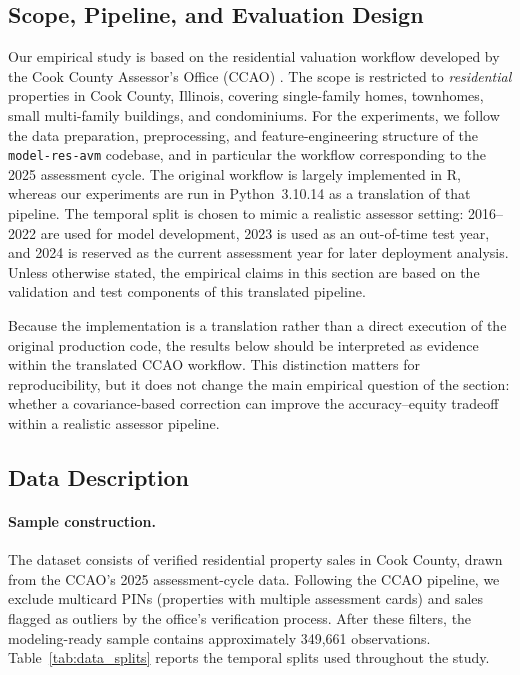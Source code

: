 \documentclass[12pt]{article}
\theoremstyle{plain}
\theoremstyle{definition}
\newcommand{\1}{\mathbf{1}}
\begin{document}
\subsection{Scope, Pipeline, and Evaluation Design}

Our empirical study is based on the residential valuation workflow developed by the Cook County Assessor's Office (CCAO) \cite{ccao_data_2026}. The scope is restricted to \emph{residential} properties in Cook County, Illinois, covering single-family homes, townhomes, small multi-family buildings, and condominiums. For the experiments, we follow the data preparation, preprocessing, and feature-engineering structure of the \texttt{model-res-avm} codebase, and in particular the workflow corresponding to the 2025 assessment cycle. The original workflow is largely implemented in R, whereas our experiments are run in Python~3.10.14 as a translation of that pipeline. The temporal split is chosen to mimic a realistic assessor setting: 2016--2022 are used for model development, 2023 is used as an out-of-time test year, and 2024 is reserved as the current assessment year for later deployment analysis. Unless otherwise stated, the empirical claims in this section are based on the validation and test components of this translated pipeline.

Because the implementation is a translation rather than a direct execution of the original production code, the results below should be interpreted as evidence within the translated CCAO workflow. This distinction matters for reproducibility, but it does not change the main empirical question of the section: whether a covariance-based correction can improve the accuracy--equity tradeoff within a realistic assessor pipeline.

\subsection{Data Description}
\label{subsec:data_description}

\paragraph{Sample construction.} The dataset consists of verified residential property sales in Cook County, drawn from the CCAO's 2025 assessment-cycle data. Following the CCAO pipeline, we exclude multicard PINs (properties with multiple assessment cards) and sales flagged as outliers by the office's verification process. After these filters, the modeling-ready sample contains approximately 349{,}661 observations. Table~\ref{tab:data_splits} reports the temporal splits used throughout the study.
\end{document}
